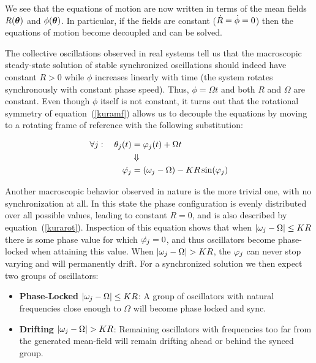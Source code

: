 We see that the equations of motion are now written in terms of the mean fields $R(\bm{\theta})$ and $\phi(\bm{\theta})$. In
particular, if the fields are constant ($\dot{R} = \dot{\phi}=0$) then the equations of motion become decoupled and can be solved.

The collective oscillations observed in real systems tell us that the macroscopic steady-state solution of stable synchronized
oscillations should indeed have constant $R>0$ while $\phi$ increases linearly with time (the system rotates synchronously with
constant phase speed).  Thus, $\phi=\Omega t$ and both $R$ and $\Omega$ are constant. Even though $\phi$ itself is not constant, it
turns out that the rotational symmetry of equation~(\ref{kuramf}) allows us to decouple the equations by moving to a rotating frame of
reference with the following substitution:

\begin{align}
    \forall j: \quad \theta_j(t) &= \varphi_j(t) + \Omega t \notag\\
    &\Downarrow \notag\\
    \dot{\varphi_j} &= (\omega_j-\Omega) - K R \sin ( \varphi_j )
    \label{kurarot}
\end{align}

Another macroscopic behavior observed in nature is the more trivial one, with no synchronization at all. In this state the phase
configuration is evenly distributed over all possible values, leading to constant $R=0$, and is also described by
equation~(\ref{kurarot}). Inspection of this equation shows that when $|\omega_j - \Omega| \leq K R$ there is some phase value for
which $\dot{\varphi_j}=0$, and thus oscillators become phase-locked when attaining this value. When $|\omega_j - \Omega| > K R$,
the $\varphi_j$ can never stop varying and will permanently drift. For a synchronized solution we then expect two groups of
oscillators:

\begin{itemize}
    \item \textbf{Phase-Locked} $|\omega_j - \Omega|\leq K R$: A group of oscillators with natural frequencies close enough to
        $\Omega$ will become phase locked and sync.
    \item \textbf{Drifting} $|\omega_j - \Omega| > K R$: Remaining oscillators with frequencies too far from the generated mean-field
        will remain drifting ahead or behind the synced group.
\end{itemize}

